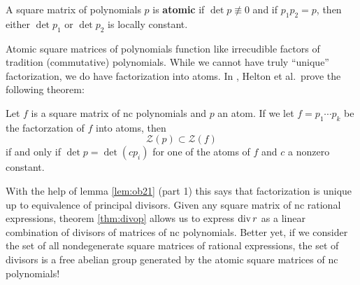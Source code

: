 \begin{definition}[Atomic]%
\label{def:atomic}
  A square matrix of polynomials \(p\) is \textbf{atomic} if
  \(\det p \not\equiv 0\) and if \(p_1p_2=p\), then either \(\det p_1\) or
  \(\det p_2\) is locally constant.
\end{definition}

Atomic square matrices of polynomials function like irrecudible factors of
tradition (commutative) polynomials. While we cannot have truly ``unique''
factorization, we do have factorization into atoms. In
\cite{heltonFactorization2019}, Helton et al.\ prove the following theorem:

\begin{theorem}
  Let \(f\) is a square matrix of nc polynomials and \(p\) an atom. If we let
  \(f = p_1 \cdots p_k\) be the factorzation of \(f\) into atoms, then
  \[
    \mathscr{Z}(p) \subset \mathscr{Z}(f)
  \]
  if and only if \(\det p = \det (c p_i)\) for one of the atoms of \(f\) and
  \(c\) a nonzero constant.
\end{theorem}

With the help of lemma \ref{lem:ob21} (part 1) this says that factorization is
unique up to equivalence of principal divisors. Given any square matrix of nc
rational expressions, theorem \ref{thm:divop} allows us to express \(\operatorname{div} r\) as a
linear combination of divisors of matrices of nc polynomials. Better yet, if we consider
the set of all nondegenerate square matrices of rational expressions, the set of
divisors is a free abelian group generated by the atomic square matrices of nc polynomials!

